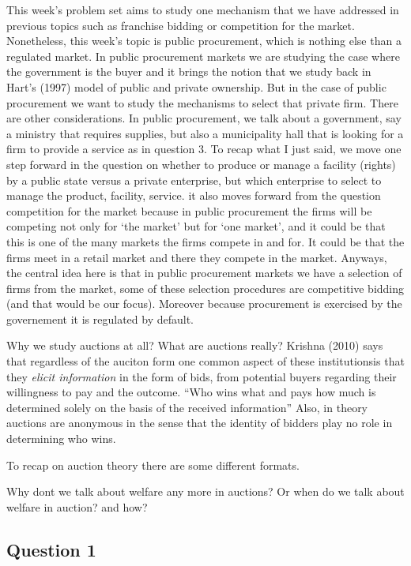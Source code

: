 \documentclass[11pt]{article} %
\begin{document}
This week's problem set aims to study one mechanism that we have addressed in previous topics such as franchise bidding or competition for the market. Nonetheless, this week's topic is public procurement, which is nothing else than a regulated market. In public procurement markets we are studying the case where the government is the buyer and it brings the notion that we study back in Hart's (1997) model of public and private ownership. But in the case of public procurement we want to study the mechanisms to select that private firm. There are other considerations. In public procurement, we talk about a government, say a ministry that requires supplies, but also a municipality hall that is looking for a firm to provide a service as in question 3. To recap what I just said, we move one step forward in the question on whether to produce or manage a facility (rights) by a public state versus a private enterprise, but which enterprise to select to manage the product, facility, service. it also moves forward from the question competition for the market because in public procurement the firms will be competing not only for `the market' but for `one market', and it could be that this is one of the many markets the firms compete in and for. It could be that  the firms meet in a retail market and there they compete in the market.
Anyways, the central idea here is that in public procurement markets we have a selection of firms from the market, some of these selection procedures are competitive bidding (and that would be our focus). Moreover because procurement is exercised by the governement it is regulated by default. 

Why we study auctions at all? What are auctions really? Krishna (2010)  says that regardless of the auciton form one common aspect of these institutionsis that they \textit{elicit information} in the form of bids, from potential buyers regarding their willingness to pay and the outcome. ``Who wins what and pays how much is determined solely on the basis of the received information'' Also, in theory auctions are anonymous in the sense that the identity of bidders play no role in determining who wins.

To recap on auction theory there are some different formats. 

Why dont we talk about welfare any more in auctions? Or when do we talk about welfare in auction? and how?

\subsection{Question 1}
\end{document}
